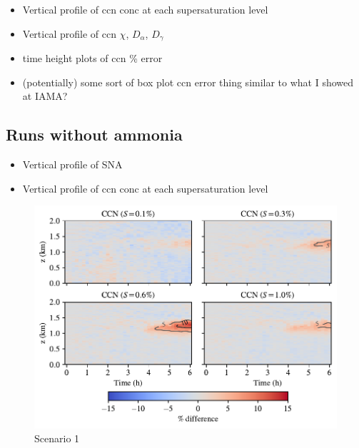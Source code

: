 \begin{itemize}
\item Vertical profile of ccn conc at each supersaturation level
\item Vertical profile of ccn $\chi$, $D_{\alpha}$, $D_{\gamma}$
\item time height plots of ccn \% error
\item (potentially) some sort of box plot ccn error thing similar to what I showed at IAMA?
\end{itemize}

\subsection{Runs without ammonia}

\begin{itemize}
\item Vertical profile of SNA
\item Vertical profile of ccn conc at each supersaturation level
\end{itemize}


\newpage
\begin{figure}[h]
  \centering
    \includegraphics[width=\textwidth]{figures/chapter5/height-time-ccn-pdiff-fx1fy0.pdf}
    \caption{Scenario 1}
    \label{fig:ht-ccn-pdiff-s1}
\end{figure}

